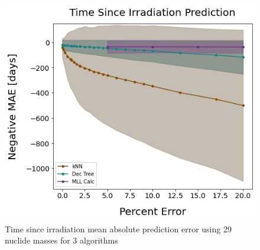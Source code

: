 \begin{frame}
\begin{adjustwidth}{-15pt}{0pt}
\begin{minipage}{0.5\textwidth}
\begin{figure}
      \includegraphics[width=1.08\linewidth]{./figures/randerr_compare_nuc29_cool.png}
      \caption{Time since irradiation mean absolute prediction error using 29 nuclide masses for 3 algorithms}
    \end{figure}
  \end{minipage}
  \end{adjustwidth}
\end{frame}

